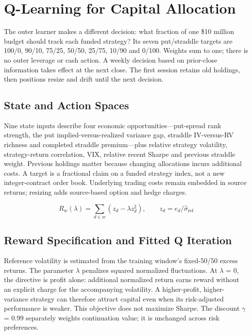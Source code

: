 \section{Q-Learning for Capital Allocation}\label{sec:14}

The outer learner makes a different decision: what fraction of one \$10 million budget should track each funded strategy? Its seven put/straddle targets are 100/0, 90/10, 75/25, 50/50, 25/75, 10/90 and 0/100. Weights sum to one; there is no outer leverage or cash action. A weekly decision based on prior-close information takes effect at the next close. The first session retains old holdings, then positions resize and drift until the next decision.


\subsection*{State and Action Spaces}

Nine state inputs describe four economic opportunities---put-spread rank strength, the put implied-versus-realized variance gap, straddle IV-versus-RV richness and completed straddle premium---plus relative strategy volatility, strategy-return correlation, VIX, relative recent Sharpe and previous straddle weight. Previous holdings matter because changing allocations incurs additional costs. A target is a fractional claim on a funded strategy index, not a new integer-contract order book. Underlying trading costs remain embedded in source returns; resizing adds source-based option and hedge charges.


\begin{equation*}R_w(\lambda)=\sum_{d\in w}(z_d-\lambda z_d^2),\qquad z_d=e_d/\widehat{\sigma}_{\mathrm{ref}}\end{equation*}

\subsection*{Reward Specification and Fitted Q Iteration}

Reference volatility is estimated from the training window's fixed-50/50 excess returns. The parameter \(\lambda\) penalizes squared normalized fluctuations. At \(\lambda\) = 0, the directive is profit alone: additional normalized return earns reward without an explicit charge for the accompanying volatility. A higher-profit, higher-variance strategy can therefore attract capital even when its risk-adjusted performance is weaker. This objective does not maximize Sharpe. The discount \(\gamma\) = 0.99 separately weights continuation value; it is unchanged across risk preferences.


